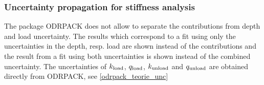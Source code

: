  
 \subsubsection{Uncertainty propagation for stiffness analysis} \label{stiffness_unc}
The package ODRPACK does not allow to separate the contributions from depth and load uncertainty. 
The results which correspond to a fit using only the uncertainties in the depth, resp. load are shown instead of the contributions and 
the result from a fit using both uncertainties is shown instead of the combined uncertainty.
The uncertainties of $k_{\mathrm{load}}$, $q_{\mathrm{load}}$, $k_{\mathrm{unload}}$ and $q_{\mathrm{unload}}$ are obtained directly from ODRPACK, see \ref{odrpack_teorie_unc}
